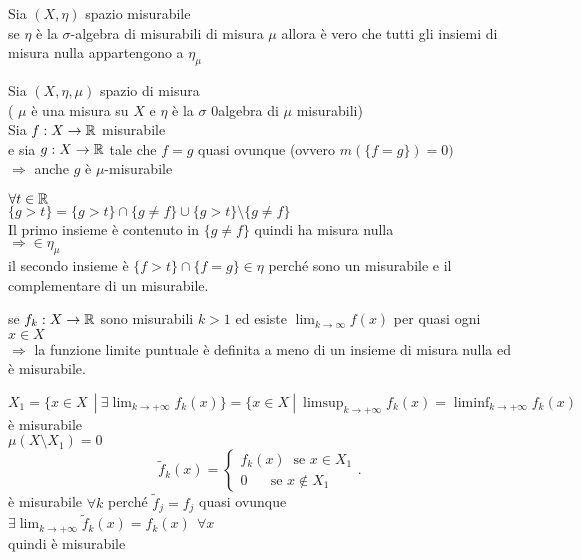 \documentclass[12px]{article}
\begin{document}
	Sia $(X,\eta)$ spazio misurabile\\
	se $\eta$ è la $\sigma$-algebra di misurabili di misura $\mu$ allora è vero che tutti gli insiemi di misura nulla appartengono a  $\eta_\mu$ \\
	\begin{prop}
		Sia $(X,\eta,\mu)$ spazio di misura\\
		( $\mu$ è una misura su $X$ e $\eta$ è la $\sigma$ 0algebra di $\mu$ misurabili)\\
		Sia $f:X \rightarrow \mathbb{R}$ misurabile\\
		e sia $g: X \rightarrow\mathbb{R}$ tale che $f= g$ quasi ovunque (ovvero $m(\{f=g\})= 0)$ \\
		$ \Rightarrow $ anche $g$ è $\mu$-misurabile
	\end{prop}
	\begin{dimo}
		$\forall t\in \mathbb{R}$\\
		$\{g > t\} = \{ g > t\}\cap \{g\neq f\}\cup\{g > t\}\setminus \{g\neq f\}$ \\
		Il primo insieme è contenuto in $\{g\neq f\}$ quindi ha misura nulla\\
		 $ \Rightarrow \in \eta_\mu$ \\
		 il secondo insieme è $\{ f > t\}\cap \{f = g\}\in \eta$ perché sono un misurabile e il complementare di un misurabile.\\
		 
	\end{dimo}
	\begin{coro}
		se $f_k:X \rightarrow\mathbb{R}$ sono misurabili $k > 1$ ed esiste  $\lim_{k \rightarrow \infty}f(x)$ per quasi ogni $x\in X$\\
		 $ \Rightarrow  $ la funzione limite puntuale è definita a meno di un insieme di misura nulla ed è misurabile.
	\end{coro}
	\begin{dimo}
		$X_1 = \{x\in X \ \ | \ \exists \lim_{k \rightarrow + \infty}f_k(x)\} = \{x\in X\ | \ \limsup_{k \rightarrow +\infty} f_k(x) = \liminf_{k \rightarrow +\infty}f_k(x)$ è misurabile\\
			$\mu (X\setminus X_1)= 0$
			\[
			\tilde f_k(x) = \begin{cases}
				f_k(x) \ \text { se } x\in X_1\\
				0  \ \ \ \ \ \ \text { se } x\not\in X_1
			\end{cases}
			.\] 
			è misurabile $\forall k$ perché  $\tilde f_j = f_j$  quasi ovunque\\
			$\exists \lim_{k \rightarrow +\infty}\tilde f_k(x) = f_k(x) \ \ \forall x$\\
			quindi è misurabile
	\end{dimo}
\end{document}
